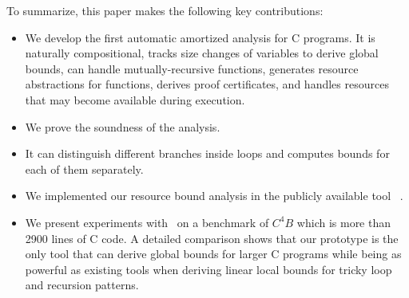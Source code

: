 To summarize, this paper makes the following key contributions:
\vspace{-0.1cm}
\begin{itemize}
	\item We develop the first automatic amortized analysis for C programs. It is naturally compositional, tracks size changes of variables to derive global bounds, can handle mutually-recursive
	functions, generates resource abstractions for functions, derives
	proof certificates, and handles resources that may become available during execution.
	
	\item We prove the soundness of the analysis.
%	
	\item It can distinguish different branches inside loops and computes bounds for each of them separately.

	\item We implemented our resource bound analysis in the publicly available tool \SystemName\ .
	\item We present experiments with \SystemName\ on a benchmark of $C^{4}B$ which is more than 2900 lines of C code. A detailed comparison shows that our prototype is the only tool that can derive global bounds for larger C programs while being as powerful as existing tools when deriving linear local bounds for tricky loop and recursion patterns.
\end{itemize}





